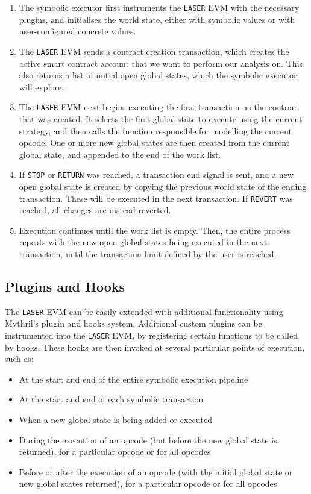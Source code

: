 \begin{enumerate}
    \item The symbolic executor first instruments the \texttt{LASER} EVM with the necessary plugins, and
    initialises the world state, either with symbolic values or with user-configured concrete values.
    \item The \texttt{LASER} EVM sends a contract creation transaction, which creates the active smart 
    contract account that we want to perform our analysis on. This also returns a list of initial open global states,
    which the symbolic executor will explore.
    \item The \texttt{LASER} EVM next begins executing the first transaction on the contract that was created.
    It selects the first global state to execute using the current strategy, and then calls the function responsible
    for modelling the current opcode. One or more new global states are then created from the current global state,
    and appended to the end of the work list.
    \item If \texttt{STOP} or \texttt{RETURN} was reached,
    a transaction end signal is sent, and a new open global state is created by copying the previous world state
    of the ending transaction. These will be executed in the next transaction. If \texttt{REVERT} was reached,
    all changes are instead reverted.
    \item Execution continues until the work list is empty. Then, the entire process repeats with the new 
    open global states being executed in the next transaction, until the transaction limit defined by the 
    user is reached.
\end{enumerate}

\subsection{Plugins and Hooks}

The \texttt{LASER} EVM can be easily extended with additional functionality using Mythril's plugin and hooks system. 
Additional custom plugins can be instrumented into the \texttt{LASER} EVM, by registering certain functions
to be called by hooks. These hooks are then invoked at several particular points of execution, such as:

\begin{itemize}
    \item At the start and end of the entire symbolic execution pipeline
    \item At the start and end of each symbolic transaction
    \item When a new global state is being added or executed
    \item During the execution of an opcode (but before the new global state is returned), for a particular opcode or for all opcodes
    \item Before or after the execution of an opcode (with the initial global state or new global states returned), for a particular opcode or for all opcodes
\end{itemize}

